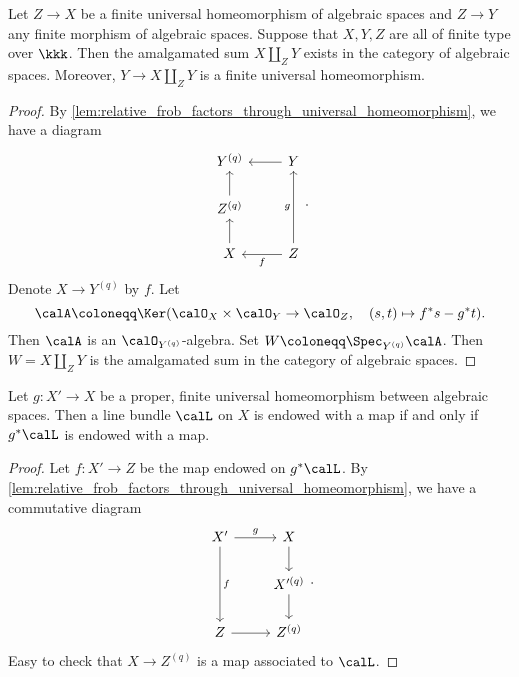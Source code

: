     \begin{corollary}\label{lem:amalgamated_sum_exist_for_finite_universal_homeomorphism_in_char_p}
        Let \(Z \to X\) be a finite universal homeomorphism of algebraic spaces and \(Z \to Y\) any finite morphism of algebraic spaces.
        Suppose that \(X,Y,Z\) are all of finite type over \(\kkk\).
        Then the amalgamated sum \(X \amalg_Z Y\) exists in the category of algebraic spaces.
        Moreover, \(Y \to X \amalg_Z Y\) is a finite universal homeomorphism.
    \end{corollary}
    \begin{proof}
        By \cref{lem:relative_frob_factors_through_universal_homeomorphism}, we have a diagram 
        \[ \begin{tikzcd}
            Y^{(q)}  & Y \arrow[l] \\
            Z^{(q)} \arrow[u] &  \\
            X \arrow[u] & Z \arrow[l, "f"] \arrow[uu, "g"]
        \end{tikzcd}. \]
        Denote \(X \to Y^{(q)}\) by \(f\).
        Let 
        \[ \calA \coloneqq \Ker (\calO_X \times \calO_Y \to \calO_{Z}, \quad (s,t) \mapsto f^*s - g^*t). \]
        Then \(\calA\) is an \(\calO_{Y^{(q)}}\)-algebra.
        Set \(W \coloneqq \Spec_{Y^{(q)}} \calA\).
        Then \(W = X \amalg_Z Y\) is the amalgamated sum in the category of algebraic spaces.
    \end{proof}

    \begin{proposition}\label{prop:EWM_for_non-reduced}
        Let \(g: X' \to X\) be a proper, finite universal homeomorphism between algebraic spaces.
        Then a line bundle \(\calL\) on \(X\) is endowed with a map if and only if \(g^*\calL\) is endowed with a map.
    \end{proposition}
    \begin{proof}
        Let \(f:X' \to Z\) be the map endowed on \(g^*\calL\).
        By \cref{lem:relative_frob_factors_through_universal_homeomorphism}, we have a commutative diagram
        \[ \begin{tikzcd}
            X' \arrow[r, "g"] \arrow[dd, "f"] & X \arrow[d] \\
             & X'^{(q)} \arrow[d]  \\
            Z \arrow[r] & Z^{(q)}
        \end{tikzcd}. \]
        Easy to check that \(X \to Z^{(q)}\) is a map associated to \(\calL\).
    \end{proof}

